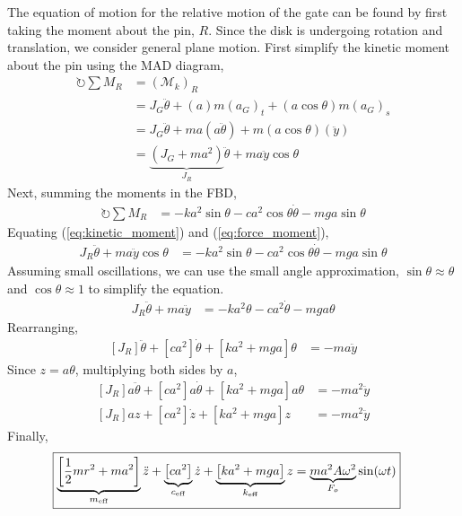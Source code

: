 The equation of motion for the relative motion of the gate can be found by first taking the moment about the pin, $R$. Since the disk is undergoing rotation and translation, we consider general plane motion. First simplify the kinetic moment about the pin using the MAD diagram,
\begin{align}
    \circlearrowright \sum M_R &= (\mathcal{M}_k)_R \nonumber \\
    &= J_G \ddot{\theta}  + (a) m (a_G)_t  + (a \cos\theta) m (a_G)_s  \nonumber \\
    &= J_G \ddot{\theta} + ma (a\ddot{\theta})  + m(a \cos\theta) (\ddot{y})  \nonumber \\
    &= \underbrace{(J_G + m a^2)}_{J_{R}} \ddot{\theta} + m a \ddot{y} \cos\theta \label{eq:kinetic_moment}
\end{align}
Next, summing the moments in the FBD,
\begin{align}
    \circlearrowright \sum M_R &= -k a^2 \sin\theta - c a^2 \cos\theta \dot{\theta} - m g a \sin\theta \label{eq:force_moment}
\end{align}
Equating (\ref{eq:kinetic_moment}) and (\ref{eq:force_moment}), 
\begin{align*}
    J_R \ddot{\theta} + m a \ddot{y} \cos\theta &= -k a^2 \sin\theta - c a^2 \cos\theta \dot{\theta} - m g a \sin\theta
\end{align*}
Assuming small oscillations, we can use the small angle approximation, $\sin\theta \approx \theta$ and $\cos\theta \approx 1$ to simplify the equation.
\begin{align*}
    J_R \ddot{\theta} + m a \ddot{y} &= -k a^2 \theta - c a^2 \dot{\theta} - m g a \theta
\end{align*}
Rearranging,
\begin{align*}
    \left[J_R \right] \ddot{\theta} + \left[c a^2 \right] \dot{\theta} + \left[ k a^2 + m g a \right] \theta &= - m a \ddot{y}
\end{align*}
Since $z = a\theta$, multiplying both sides by $a$,
\begin{align*}
    \left[J_R \right] a \ddot{\theta} + \left[c a^2 \right] a \dot{\theta} + \left[ k a^2 + m g a \right] a \theta &= - m a^2 \ddot{y} \\
    \left[J_R \right] a z + \left[c a^2 \right] \dot{z} + \left[ k a^2 + m g a \right] z &= - m a^2 \ddot{y} 
\end{align*}
Finally,
\begin{align*}
    \Aboxed{\underbrace{\left[\frac{1}{2} m r^2 + m a^2 \right]}_{m_{\text{eff}}} \ddot{z} + \underbrace{\left[c a^2 \right]}_{c_{\text{eff}}} \dot{z} + \underbrace{\left[ k a^2 + m g a \right]}_{k_{\text{eff}}} z &= \underbrace{m a^2 A \omega^2}_{F_o} \sin(\omega t)}
\end{align*}

